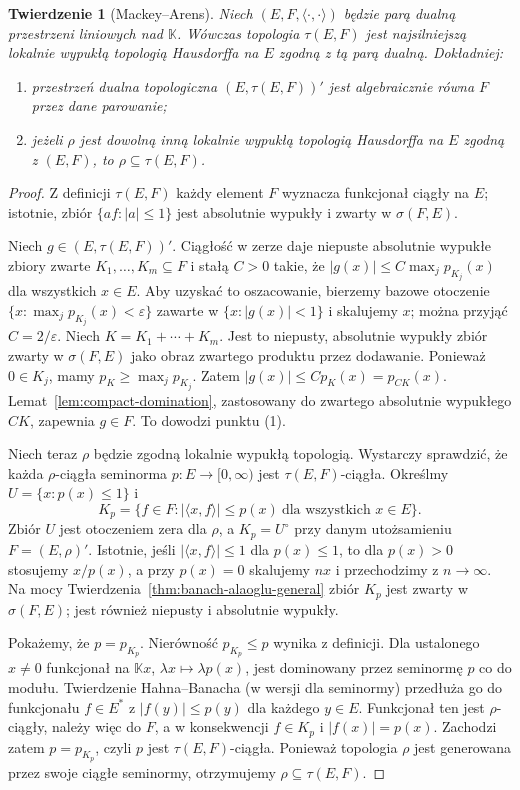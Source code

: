 \documentclass[11pt,a4paper]{article}
\numberwithin{equation}{section}
\theoremstyle{plain}
\newtheorem{twierdzenie}{Twierdzenie}[section]
\theoremstyle{definition}
\theoremstyle{remark}
\newcommand{\K}{\mathbb K}
\begin{document}
\begin{twierdzenie}[Mackey--Arens]\label{thm:mackey-arens}
Niech $(E,F,\langle\cdot,\cdot\rangle)$ będzie parą dualną
przestrzeni liniowych nad $\K$. Wówczas topologia
$\tau(E,F)$ jest \emph{najsilniejszą} lokalnie wypukłą
topologią Hausdorffa na $E$ zgodną z tą parą dualną.
Dokładniej:
\begin{enumerate}
\item przestrzeń dualna topologiczna $(E,\tau(E,F))'$ jest
      algebraicznie równa $F$ przez dane parowanie;
\item jeżeli $\rho$ jest dowolną inną lokalnie wypukłą topologią
      Hausdorffa na $E$ zgodną z $(E,F)$, to $\rho\subseteq\tau(E,F)$.
\end{enumerate}
\end{twierdzenie}
\begin{proof}
Z definicji $\tau(E,F)$ każdy element $F$ wyznacza
funkcjonał ciągły na $E$; istotnie, zbiór
$\{af:|a|\le1\}$ jest absolutnie wypukły i zwarty
w $\sigma(F,E)$.

Niech $g\in(E,\tau(E,F))'$. Ciągłość w zerze daje
niepuste absolutnie wypukłe zbiory zwarte
$K_1,\ldots,K_m\subseteq F$ i stałą $C>0$ takie, że
$|g(x)|\le C\max_j p_{K_j}(x)$ dla wszystkich $x\in E$.
Aby uzyskać to oszacowanie, bierzemy bazowe otoczenie
$\{x:\max_j p_{K_j}(x)<\varepsilon\}$ zawarte w
$\{x:|g(x)|<1\}$ i skalujemy $x$; można przyjąć
$C=2/\varepsilon$. Niech $K=K_1+\cdots+K_m$.
Jest to niepusty, absolutnie wypukły zbiór zwarty
w $\sigma(F,E)$ jako obraz zwartego produktu przez dodawanie.
Ponieważ $0\in K_j$, mamy $p_K\ge\max_j p_{K_j}$.
Zatem $|g(x)|\le C p_K(x)=p_{CK}(x)$.
Lemat~\ref{lem:compact-domination}, zastosowany do zwartego
absolutnie wypukłego $CK$, zapewnia $g\in F$.
To dowodzi punktu (1).

Niech teraz $\rho$ będzie zgodną lokalnie wypukłą topologią.
Wystarczy sprawdzić, że każda $\rho$-ciągła seminorma
$p:E\to[0,\infty)$ jest $\tau(E,F)$-ciągła.
Określmy $U=\{x:p(x)\le1\}$ i
\[
 K_p=\{f\in F:|\langle x,f\rangle|\le p(x)
                 \ \text{dla wszystkich }x\in E\}.
\]
Zbiór $U$ jest otoczeniem zera dla $\rho$, a
$K_p=U^\circ$ przy danym utożsamieniu $F=(E,\rho)'$.
Istotnie, jeśli $|\langle x,f\rangle|\le1$ dla $p(x)\le1$,
to dla $p(x)>0$ stosujemy $x/p(x)$, a przy $p(x)=0$
skalujemy $nx$ i przechodzimy z $n\to\infty$.
Na mocy Twierdzenia~\ref{thm:banach-alaoglu-general}
zbiór $K_p$ jest zwarty w $\sigma(F,E)$;
jest również niepusty i absolutnie wypukły.

Pokażemy, że $p=p_{K_p}$. Nierówność $p_{K_p}\le p$
wynika z definicji. Dla ustalonego $x\ne0$ funkcjonał
na $\K x$, $\lambda x\mapsto\lambda p(x)$,
jest dominowany przez seminormę $p$ co do modułu.
Twierdzenie Hahna--Banacha (w wersji dla seminormy)
przedłuża go do funkcjonału $f\in E^*$ z
$|f(y)|\le p(y)$ dla każdego $y\in E$.
Funkcjonał ten jest $\rho$-ciągły, należy więc do $F$,
a w konsekwencji $f\in K_p$ i $|f(x)|=p(x)$.
Zachodzi zatem $p=p_{K_p}$, czyli $p$ jest
$\tau(E,F)$-ciągła. Ponieważ topologia $\rho$ jest
generowana przez swoje ciągłe seminormy, otrzymujemy
$\rho\subseteq\tau(E,F)$.
\end{proof}
\end{document}
